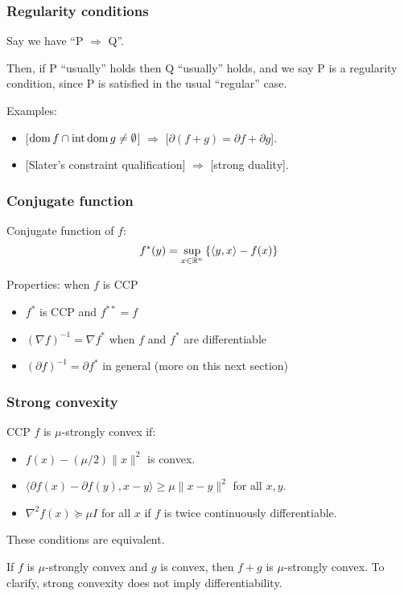 \documentclass[10pt,mathserif]{beamer}
\begin{document}
\begin{frame}
\frametitle{Regularity conditions}

Say we have 
``P $\Rightarrow$ Q''.
\vspace{0.2in}

Then, if P ``usually'' holds then Q ``usually'' holds, and we say P is a regularity condition, since P is satisfied in the usual ``regular'' case.

\vspace{0.2in}

Examples:
\begin{itemize}
\item 

[$\mathrm{dom}\, f\cap \mathrm{int}\,\mathrm{dom}\, g\ne \emptyset$] $\Rightarrow$ [$\partial (f+g)=\partial f+\partial g$].
\item

[Slater's constraint qualification] $\Rightarrow$ [strong duality].
\end{itemize}


\end{frame}




\begin{frame}
\frametitle{Conjugate function}
Conjugate function of $f$:
\[
f^*(y)=\sup_{x\in\mathbb{R}^n}\left\{\langle y,x\rangle-f(x)\right\}
\]

\vspace{0.2in}

Properties: when $f$ is CCP
\begin{itemize}
\item
$f^*$ is CCP and  $f^{**}=f$
\item
$(\nabla f)^{-1}=\nabla f^*$ when $f$ and $f^*$ are differentiable
\item
$(\partial f)^{-1}=\partial f^*$ in general (more on this next section)
\end{itemize}
\end{frame}

\begin{frame}
\frametitle{Strong convexity}
CCP $f$ is $\mu$-strongly convex if:
\begin{itemize}
\item $f(x)-(\mu/2)\|x\|^2$ is convex.
\item $\langle \partial f(x)-\partial f(y),x-y\rangle \ge \mu\|x-y\|^2$ for all $x,y$.
\item
$\nabla^2f(x)\succeq \mu I$ for all $x$ if $f$ is twice continuously differentiable.
\end{itemize}
These conditions are equivalent.

\vspace{0.2in}

If $f$ is $\mu$-strongly convex and $g$ is convex, then $f+g$ is $\mu$-strongly convex.
To clarify, strong convexity does not imply differentiability.
\end{frame}
\end{document}
